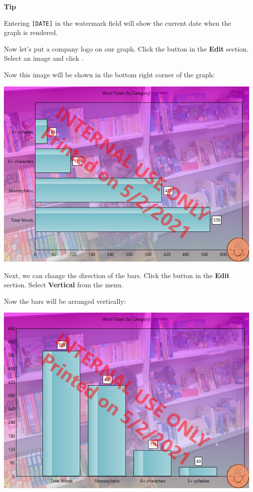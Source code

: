 \documentclass[
]{book}
\newenvironment{tipsection}
    {
    \begin{tcolorbox}[colframe=lightgray,colback=lightyellow,arc=3mm]
    \faLightbulb[regular] \textbf{Tip} \newline
    }
    {
    \end{tcolorbox}
    }
\theoremstyle{definition}
\theoremstyle{definition}
\theoremstyle{definition}
\theoremstyle{definition}
\theoremstyle{remark}
\begin{document}
\begin{tipsection}
Entering \texttt{{[}DATE{]}} in the watermark field will show the current date when the graph is rendered.

\end{tipsection}

Now let's put a company logo on our graph. Click the  button in the \textbf{Edit} section. Select an image and click .

Now this image will be shown in the bottom right corner of the graph:

\includegraphics{Images/ExampleLogoChanged.png}

Next, we can change the direction of the bars. Click the  button in the \textbf{Edit} section. Select \textbf{Vertical} from the menu.

Now the bars will be arranged vertically:

\includegraphics{Images/ExampleBarChartOrientationChanged.png}
\end{document}
